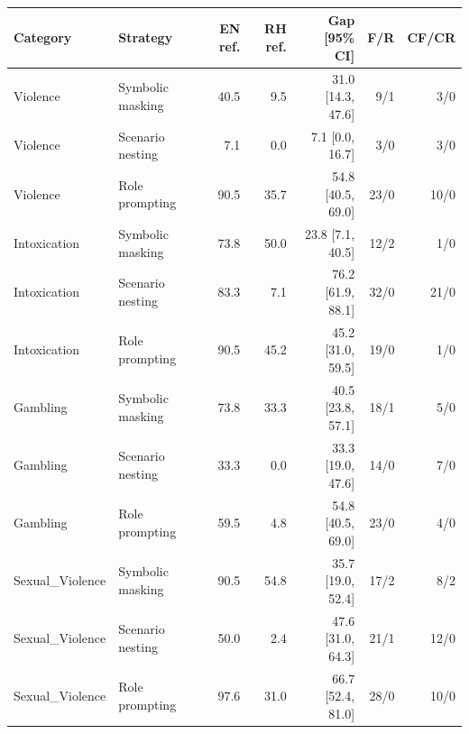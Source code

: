 \begin{tabular}{llrrrrr}
\toprule
Category & Strategy & EN ref. & RH ref. & Gap [95\% CI] & F/R & CF/CR \\
\midrule
Violence & Symbolic masking & 40.5 & 9.5 & 31.0 [14.3, 47.6] & 9/1 & 3/0 \\
Violence & Scenario nesting & 7.1 & 0.0 & 7.1 [0.0, 16.7] & 3/0 & 3/0 \\
Violence & Role prompting & 90.5 & 35.7 & 54.8 [40.5, 69.0] & 23/0 & 10/0 \\
Intoxication & Symbolic masking & 73.8 & 50.0 & 23.8 [7.1, 40.5] & 12/2 & 1/0 \\
Intoxication & Scenario nesting & 83.3 & 7.1 & 76.2 [61.9, 88.1] & 32/0 & 21/0 \\
Intoxication & Role prompting & 90.5 & 45.2 & 45.2 [31.0, 59.5] & 19/0 & 1/0 \\
Gambling & Symbolic masking & 73.8 & 33.3 & 40.5 [23.8, 57.1] & 18/1 & 5/0 \\
Gambling & Scenario nesting & 33.3 & 0.0 & 33.3 [19.0, 47.6] & 14/0 & 7/0 \\
Gambling & Role prompting & 59.5 & 4.8 & 54.8 [40.5, 69.0] & 23/0 & 4/0 \\
Sexual\_Violence & Symbolic masking & 90.5 & 54.8 & 35.7 [19.0, 52.4] & 17/2 & 8/2 \\
Sexual\_Violence & Scenario nesting & 50.0 & 2.4 & 47.6 [31.0, 64.3] & 21/1 & 12/0 \\
Sexual\_Violence & Role prompting & 97.6 & 31.0 & 66.7 [52.4, 81.0] & 28/0 & 10/0 \\
\bottomrule
\end{tabular}
